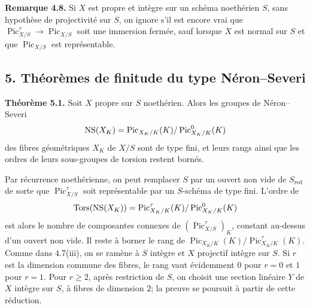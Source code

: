 \documentclass[11pt]{article}
\providecommand{\Pic}{\operatorname{Pic}}
\begin{document}
\textbf{Remarque 4.8.} Si $X$ est propre et int\`egre sur un sch\'ema noeth\'erien $S$, sans hypoth\`ese de projectivit\'e sur $S$, on ignore s'il est encore vrai que $\Pic^\tau_{X/S}\to\Pic_{X/S}$ soit une immersion ferm\'ee, sauf lorsque $X$ est normal sur $S$ et que $\Pic_{X/S}$ est repr\'esentable.

\subsection*{5. Th\'eor\`emes de finitude du type N\'eron--Severi}
\textbf{Th\'eor\`eme 5.1.} Soit $X$ propre sur $S$ noeth\'erien. Alors les groupes de N\'eron--Severi
\[
 \NS(X_K)=\Pic_{X_K/K}(K)/\Pic^0_{X_K/K}(K)
\]
des fibres g\'eom\'etriques $X_K$ de $X/S$ sont de type fini, et leurs rangs ainsi que les ordres de leurs sous-groupes de torsion restent born\'es.

Par r\'ecurrence noeth\'erienne, on peut remplacer $S$ par un ouvert non vide de $S_{\mathrm{red}}$ de sorte que $\Pic^\tau_{X/S}$ soit repr\'esentable par un $S$-sch\'ema de type fini. L'ordre de
\[
\Tors(\NS(X_K))=\Pic^\tau_{X_K/K}(K)/\Pic^0_{X_K/K}(K)
\]
est alors le nombre de composantes connexes de $(\Pic^\tau_{X/S})_K$, constant au-dessus d'un ouvert non vide. Il reste \`a borner le rang de $\Pic_{X_K/K}(K)/\Pic^\tau_{X_K/K}(K)$. Comme dans 4.7(iii), on se ram\`ene \`a $S$ int\`egre et $X$ projectif int\`egre sur $S$. Si $r$ est la dimension commune des fibres, le rang vaut \'evidemment $0$ pour $r=0$ et $1$ pour $r=1$. Pour $r\ge2$, apr\`es restriction de $S$, on choisit une section lin\'eaire $Y$ de $X$ int\`egre sur $S$, \`a fibres de dimension $2$; la preuve se poursuit \`a partir de cette r\'eduction.
\end{document}
